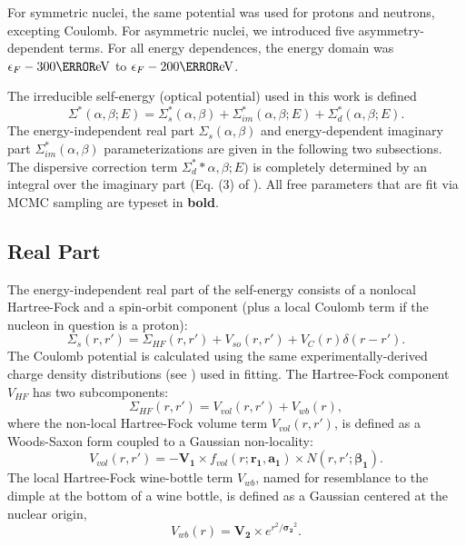 \documentclass[twocolumn,secnumarabic,amssymb, nobibnotes, aps, prl,
superscriptaddress, nobalancelastpage, draft]{revtex4}
\begin{document}
For symmetric nuclei, the same potential was used for protons and neutrons,
excepting Coulomb. For asymmetric nuclei, we introduced five asymmetry-dependent terms.
For all energy dependences, the energy domain was $\epsilon_{F}-300
\mega\electronvolt$ to $\epsilon_{F}-200 \mega\electronvolt$.

The irreducible self-energy (optical potential) used in this work is defined
\begin{equation} \label{SelfEnergyBreakdown}
    \Sigma^{*}(\alpha,\beta;E) =  \Sigma_{s}^{*}(\alpha,\beta) + \Sigma_{im}^{*}(\alpha,\beta;E)
    + \Sigma_{d}^{*}(\alpha,\beta;E).
\end{equation}
The energy-independent real part $\Sigma_{s}(\alpha,\beta)$ and 
energy-dependent imaginary part $\Sigma_{im}^{*}(\alpha,\beta)$
parameterizations are given in the following two subsections. The
dispersive correction term $\Sigma_{d}^{*}*\alpha,\beta;E)$ is completely
determined by an integral over the imaginary part (Eq. (3) of
\cite{Mahzoon2014}). All free parameters that are fit via MCMC sampling are
typeset in \textbf{bold}.

\subsection{Real Part}
The energy-independent real part of the self-energy consists of a nonlocal Hartree-Fock and
a spin-orbit component (plus a local Coulomb term if the nucleon in question is a proton):
\begin{equation}
    \Sigma_{s}(r,r') =
    \Sigma_{HF}(r,r')+V_{so}(r,r')+V_{C}(r)\delta(r-r').
\end{equation}
The Coulomb potential is calculated using the same experimentally-derived charge
density distributions (see \cite{DeVries1987}) used in fitting.
The Hartree-Fock component $V_{HF}$ has two subcomponents:
\begin{equation} \label{HFWBEquation}
    \Sigma_{HF}(r,r') = V_{vol}(r,r') + V_{wb}(r),
\end{equation}
where the non-local Hartree-Fock volume term $V_{vol}(r,r')$, is defined as
a Woods-Saxon form coupled to a Gaussian non-locality:
\begin{equation} \label{RealVolume}
    V_{vol}(r,r') = -\mathbf{V_{1}}{\times}f_{vol}(r; \mathbf{r_{1}}, \mathbf{a_{1}})
    {\times}N(r,r';\boldsymbol{\beta_{1}}).
\end{equation}
The local Hartree-Fock wine-bottle
term $V_{wb}$, named for resemblance to the dimple at the bottom of a wine
bottle, is defined as a Gaussian centered at the nuclear origin,
\begin{equation}
    V_{wb}(r) = \mathbf{V_{2}}{\times}e^{r^{2}/\boldsymbol{\sigma_{2}}^{2}}.
\end{equation}
\end{document}
